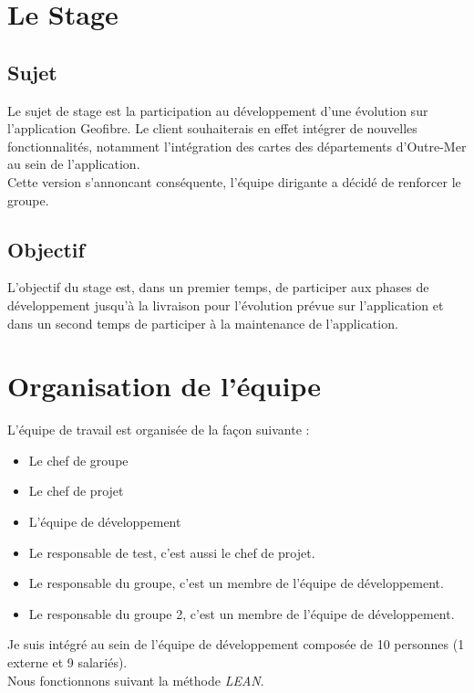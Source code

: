 \chapter{Le Stage}
\section{Sujet}

Le sujet de stage est la participation au développement d'une évolution sur l'application Geofibre.
Le client souhaiterais en effet intégrer de nouvelles fonctionnalités, notamment l'intégration des cartes des départements d'Outre-Mer au sein de l'application.
\\Cette version s'annoncant conséquente, l'équipe dirigante a décidé de renforcer le groupe.

\section{Objectif}


L'objectif du stage est, dans un premier temps, de participer aux phases de développement jusqu'à la livraison pour l'évolution prévue sur l'application et dans un second temps de participer à la maintenance de l'application.

\chapter{Organisation de l'équipe}

L'équipe de travail est organisée de la façon suivante :\\

\begin{itemize}
  \item Le chef de groupe
  \item Le chef de projet
  \item L'équipe de développement
  \item Le responsable de test, c'est aussi le chef de projet.
  \item Le responsable du groupe, c'est un membre de l'équipe de développement.
  \item Le responsable du groupe 2, c'est un membre de l'équipe de développement.\\
\end{itemize}
Je suis intégré au sein de l'équipe de développement composée de 10 personnes (1 externe et 9 salariés).
\\Nous fonctionnons suivant la méthode \textit{LEAN}.

